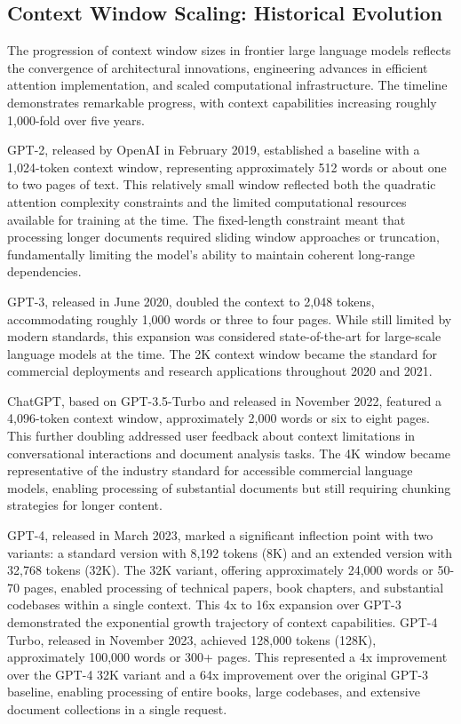 \documentclass[11pt,letterpaper]{article}
\begin{document}
\subsection{Context Window Scaling: Historical Evolution}

The progression of context window sizes in frontier large language models reflects the convergence of architectural innovations, engineering advances in efficient attention implementation, and scaled computational infrastructure. The timeline demonstrates remarkable progress, with context capabilities increasing roughly 1,000-fold over five years.

GPT-2, released by OpenAI in February 2019, established a baseline with a 1,024-token context window, representing approximately 512 words or about one to two pages of text. This relatively small window reflected both the quadratic attention complexity constraints and the limited computational resources available for training at the time. The fixed-length constraint meant that processing longer documents required sliding window approaches or truncation, fundamentally limiting the model's ability to maintain coherent long-range dependencies.

GPT-3, released in June 2020, doubled the context to 2,048 tokens, accommodating roughly 1,000 words or three to four pages. While still limited by modern standards, this expansion was considered state-of-the-art for large-scale language models at the time. The 2K context window became the standard for commercial deployments and research applications throughout 2020 and 2021.

ChatGPT, based on GPT-3.5-Turbo and released in November 2022, featured a 4,096-token context window, approximately 2,000 words or six to eight pages. This further doubling addressed user feedback about context limitations in conversational interactions and document analysis tasks. The 4K window became representative of the industry standard for accessible commercial language models, enabling processing of substantial documents but still requiring chunking strategies for longer content.

GPT-4, released in March 2023, marked a significant inflection point with two variants: a standard version with 8,192 tokens (8K) and an extended version with 32,768 tokens (32K). The 32K variant, offering approximately 24,000 words or 50-70 pages, enabled processing of technical papers, book chapters, and substantial codebases within a single context. This 4x to 16x expansion over GPT-3 demonstrated the exponential growth trajectory of context capabilities. GPT-4 Turbo, released in November 2023, achieved 128,000 tokens (128K), approximately 100,000 words or 300+ pages. This represented a 4x improvement over the GPT-4 32K variant and a 64x improvement over the original GPT-3 baseline, enabling processing of entire books, large codebases, and extensive document collections in a single request.
\end{document}
